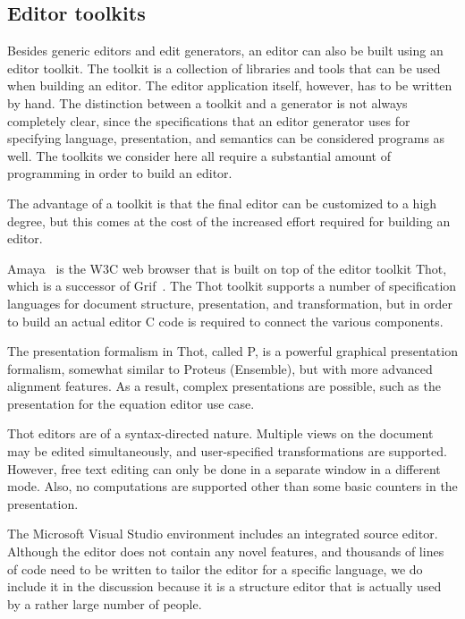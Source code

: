 \documentclass{entcs}
\begin{document}
%																
\subsection {Editor toolkits} \label{sect:toolkits}

Besides generic editors and edit generators, an editor can also be built using an editor toolkit. The toolkit is a collection of libraries and tools that can be used when building an editor. The editor application itself, however, has to be written by hand. The distinction between a toolkit and a generator is not always completely clear, since the specifications that an editor generator uses for specifying language, presentation, and semantics can be considered programs as well. The toolkits we consider here all require a substantial amount of programming in order to build an editor.

The advantage of a toolkit is that the final editor can be customized to a high degree, but this comes at the cost of the increased effort required for building an editor. 


Amaya~\cite{amaya04} is the W3C web browser that is built on top of the editor toolkit Thot\cite{quint97thot}, which is a successor of Grif~\cite{quint86grif}. The Thot toolkit supports a number of specification languages for document structure, presentation, and transformation, but in order to build an actual editor C code is required to connect the various components.

The presentation formalism in Thot, called P, is a powerful graphical presentation formalism, somewhat similar to Proteus (Ensemble), but with more advanced alignment features. As a result, complex presentations are possible, such as the presentation for the equation editor use case.

Thot editors are of a syntax-directed nature. Multiple views on the document may be edited simultaneously, and user-specified transformations are supported. However, free text editing can only be done in a separate window in a different mode. Also, no computations are supported other than some basic counters in the presentation. 

%
%


The Microsoft Visual Studio environment includes an integrated source editor. Although the editor does not contain any novel features, and thousands of lines of code need to be written to tailor the editor for a specific language, we do include it in the discussion because it is a structure editor that is actually used by a rather large number of people. 
\end{document}
